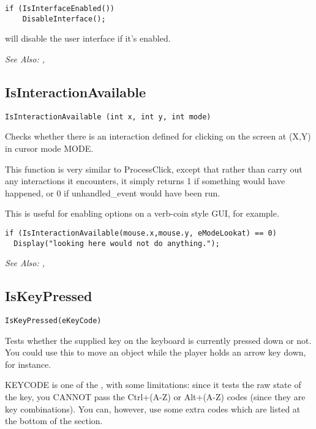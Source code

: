 \begin{verbatim}
if (IsInterfaceEnabled())
    DisableInterface();
\end{verbatim}
will disable the user interface if it's enabled.

\it{See Also:} , 


\subsection{IsInteractionAvailable}\label{IsInteractionAvailable}%

\begin{verbatim}
IsInteractionAvailable (int x, int y, int mode)
\end{verbatim}
Checks whether there is an interaction defined for clicking on the screen at (X,Y)
in cursor mode MODE.

This function is very similar to ProcessClick, except that rather than carry out any
interactions it encounters, it simply returns 1 if something would have happened, or 0 if
unhandled_event would have been run.

This is useful for enabling options on a verb-coin style GUI, for example.

\begin{verbatim}
if (IsInteractionAvailable(mouse.x,mouse.y, eModeLookat) == 0)
  Display("looking here would not do anything.");
\end{verbatim}

\it{See Also:} ,


\subsection{IsKeyPressed}\label{IsKeyPressed}%

\begin{verbatim}
IsKeyPressed(eKeyCode)
\end{verbatim}
Tests whether the supplied key on the keyboard is currently pressed down
or not. You could use this to move an object while the player holds an
arrow key down, for instance.

KEYCODE is one of the , with some limitations:
since it tests the raw state of the key, you CANNOT pass the Ctrl+(A-Z)
or Alt+(A-Z) codes (since they are key combinations). You can, however,
use some extra codes which are listed at the bottom of the section.

